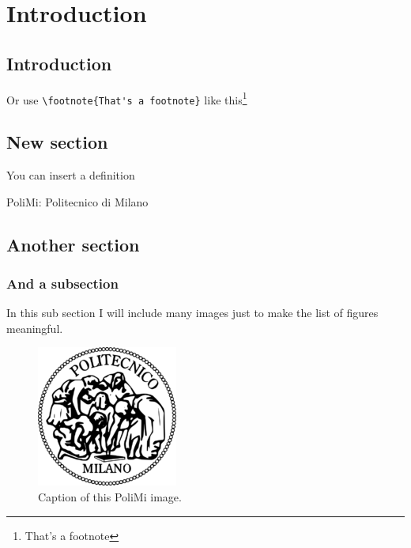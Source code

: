 \chapter{Introduction}

\section{Introduction}\label{sec:i}
Or use \verb.\footnote{That's a footnote}. like this\footnote{That's a footnote}


\section{New section}
You can insert a definition
	\begin{Definition}
		PoliMi: Politecnico di Milano
	\end{Definition}

\section{Another section}
	\subsection{And a subsection}
		In this sub section I will include many images just to make the list of figures meaningful.

			\begin{figure}[h!tb]
				\centerline {\includegraphics[scale=0.6]{img/logopoli.png}}
				\caption{Caption of this PoliMi image.}
				\label{fig:leet}
			\end{figure}

